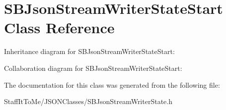 \hypertarget{interface_s_b_json_stream_writer_state_start}{
\section{\-S\-B\-Json\-Stream\-Writer\-State\-Start \-Class \-Reference}
\label{interface_s_b_json_stream_writer_state_start}
}


\-Inheritance diagram for \-S\-B\-Json\-Stream\-Writer\-State\-Start\-:


\-Collaboration diagram for \-S\-B\-Json\-Stream\-Writer\-State\-Start\-:


\-The documentation for this class was generated from the following file\-:\begin{DoxyCompactItemize}
\item 
\-Staff\-It\-To\-Me/\-J\-S\-O\-N\-Classes/\-S\-B\-Json\-Stream\-Writer\-State.\-h\end{DoxyCompactItemize}
